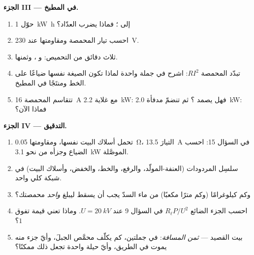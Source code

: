 \begin{problem}
\medskip
\noindent\textbf{الجزء III --- في المطبخ.}
\begin{enumerate}[resume]
  \item حوّل \qty{1}{kW.h} إلى ؛ فماذا يضرب العدّاد؟
  \item احسب تيار المحمصة ومقاومتها عند \qty{230}{V}.
  \item ثلاث دقائق من التحميص:   و
        ، وثمنها.
  \item تبدّد المحمصة $RI^2$: اشرح في جملة واحدة لماذا تكون
        الصيغة نفسها ضياعًا على الخط ومنتَجًا في المطبخ.
  \item تتقاسم المحمصة  \qty{16}{A} مع غلاية \qty{2.2}{kW}:
        فهل يصمد ؟ ثم تنضمّ مدفأة \qty{2.0}{kW}: فماذا الآن؟
\end{enumerate}

\medskip
\noindent\textbf{الجزء IV --- التدقيق.}
\begin{enumerate}[resume]
  \item تحمل أسلاك البيت نفسها، ومقاومتها \qty{0.05}{\ohm}،
        التيارَ \qty{13.5}{A} في السؤال 15: احسب الضياع وجزأه
        من نحو \qty{3.1}{kW} الموصَّلة.
  \item سلسِل المردودات (العنفة-المولّد، والرفع، والخط،
        والخفض، وأسلاك البيت) في  شبكة كلي واحد.
  \item وكم كيلوغرامًا (وكم مترًا مكعبًا) من ماء السدّ يجب أن يسقط ليبلغ
        \emph{ واحد} محمصتك؟
  \item احسب الجزء الضائع $R_\ell P/U^2$ في السؤال 9 عند
        $U = \qty{20}{kV}$. وماذا تعني قيمة تفوق $1$؟
  \item بيت القصيد --- \emph{ثمن المسافة}: في جملتين،
        كم يكلّف  محمَّص الجبلَ، وأيّ جزء
        منه يموت في الطريق، وأيّ حيلة واحدة تجعل ذلك ممكنًا؟
\end{enumerate}
\end{problem}
